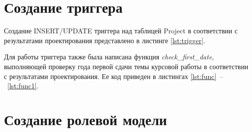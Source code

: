 \section{Создание триггера}

Создание INSERT/UPDATE триггера над таблицей Project в соответствии с результатами проектирования представлено в листинге \ref{lst:trigger}.




Для работы триггера также была написана функция \textit{check\_first\_date}, выполняющей проверку года первой сдачи темы курсовой работы в соответствии с результатами проектирования. Ее код приведен в листингах \ref{lst:func}~--~\ref{lst:func1}.



%	

\section{Создание ролевой модели}


